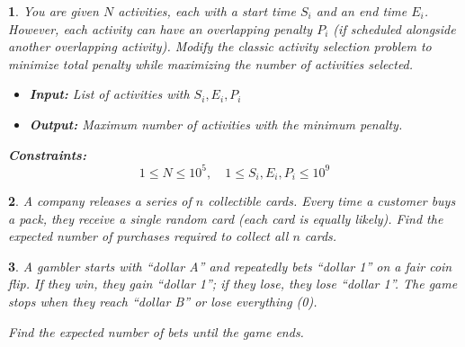\documentclass[%
addpoints]{exam}
\theoremstyle{problem}
\newtheorem{p}{}
\begin{document}

\begin{p}
You are given $N$ activities, each with a start time $S_i$ and an end time $E_i$. However, each activity can have an overlapping penalty $P_i$ (if scheduled alongside another overlapping activity). Modify the classic activity selection problem to minimize total penalty while maximizing the number of activities selected.

\begin{itemize}
    \item \textbf{Input:} List of activities with $S_i, E_i, P_i$
    \item \textbf{Output:} Maximum number of activities with the minimum penalty.
\end{itemize}

\textbf{Constraints:} 
\[
1 \leq N \leq 10^5, \quad 1 \leq S_i, E_i, P_i \leq 10^9
\]
\hfill\end{p}

\begin{p}
A company releases a series of $n$ collectible cards. Every time a customer buys a pack, they receive a single random card (each card is equally likely). Find the expected number of purchases required to collect all $n$ cards.
\hfill\end{p}

\begin{p}
A gambler starts with ``dollar A'' and repeatedly bets ``dollar 1'' on a fair coin flip. If they win, they gain ``dollar 1''; if they lose, they lose ``dollar 1''. The game stops when they reach ``dollar B'' or lose everything (0). 

Find the expected number of bets until the game ends.
\hfill\end{p}

\end{document}

